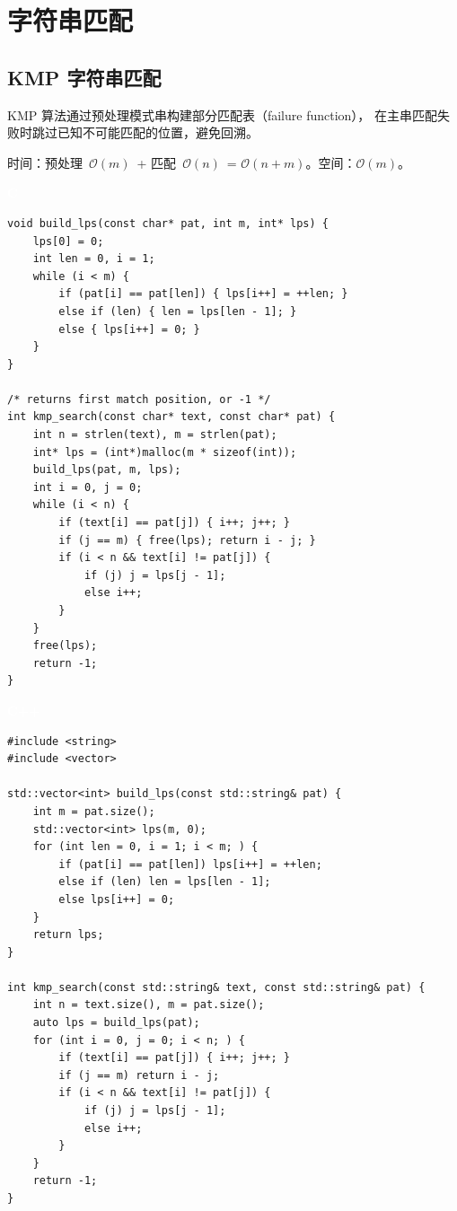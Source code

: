 \documentclass[12pt,a4paper,fontset=fandol]{ctexbook}
\newcommand{\clabel}{%
  \noindent\begin{tcolorbox}[sharp corners,colback=cheadbg,colframe=cheadbg,
    left=6pt,right=6pt,top=2pt,bottom=2pt,boxrule=0pt]
  \textcolor{white}{\small\bfseries\sffamily C}\end{tcolorbox}%
}
\newcommand{\cpplabel}{%
  \noindent\begin{tcolorbox}[sharp corners,colback=cppheadbg,colframe=cppheadbg,
    left=6pt,right=6pt,top=2pt,bottom=2pt,boxrule=0pt]
  \textcolor{white}{\small\bfseries\sffamily C++}\end{tcolorbox}%
}
\newcommand{\bigO}[1]{\mathcal{O}(#1)}
\begin{document}
\part{字符串匹配}

\chapter{KMP 字符串匹配}

KMP 算法通过预处理模式串构建部分匹配表（failure function），
在主串匹配失败时跳过已知不可能匹配的位置，避免回溯。

\begin{complexitybox}
  时间：预处理~$\bigO{m}$~+ 匹配~$\bigO{n}$~= $\bigO{n+m}$。空间：$\bigO{m}$。
\end{complexitybox}

\clabel
\begin{lstlisting}[style=cstyle]
void build_lps(const char* pat, int m, int* lps) {
    lps[0] = 0;
    int len = 0, i = 1;
    while (i < m) {
        if (pat[i] == pat[len]) { lps[i++] = ++len; }
        else if (len) { len = lps[len - 1]; }
        else { lps[i++] = 0; }
    }
}

/* returns first match position, or -1 */
int kmp_search(const char* text, const char* pat) {
    int n = strlen(text), m = strlen(pat);
    int* lps = (int*)malloc(m * sizeof(int));
    build_lps(pat, m, lps);
    int i = 0, j = 0;
    while (i < n) {
        if (text[i] == pat[j]) { i++; j++; }
        if (j == m) { free(lps); return i - j; }
        if (i < n && text[i] != pat[j]) {
            if (j) j = lps[j - 1];
            else i++;
        }
    }
    free(lps);
    return -1;
}
\end{lstlisting}

\cpplabel
\begin{lstlisting}[style=cppstyle]
#include <string>
#include <vector>

std::vector<int> build_lps(const std::string& pat) {
    int m = pat.size();
    std::vector<int> lps(m, 0);
    for (int len = 0, i = 1; i < m; ) {
        if (pat[i] == pat[len]) lps[i++] = ++len;
        else if (len) len = lps[len - 1];
        else lps[i++] = 0;
    }
    return lps;
}

int kmp_search(const std::string& text, const std::string& pat) {
    int n = text.size(), m = pat.size();
    auto lps = build_lps(pat);
    for (int i = 0, j = 0; i < n; ) {
        if (text[i] == pat[j]) { i++; j++; }
        if (j == m) return i - j;
        if (i < n && text[i] != pat[j]) {
            if (j) j = lps[j - 1];
            else i++;
        }
    }
    return -1;
}
\end{lstlisting}
\end{document}
